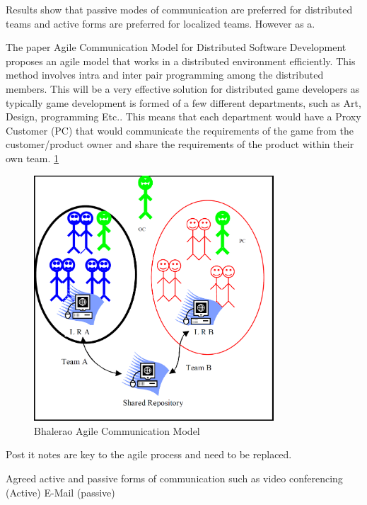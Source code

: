 \documentclass{scrartcl}
\begin{document}
Results show that passive modes of communication are preferred for distributed teams and active forms are preferred for localized teams. \cite{joshi2013} However as a. \par
The paper Agile Communication Model for Distributed Software Development \cite{bhalerao2010} proposes an agile model that works in a distributed environment efficiently. This method involves intra and inter pair programming among the distributed members. This will be a very effective solution for distributed game developers as typically game development is formed of a few different departments, such as Art, Design, programming Etc.. This means that each department would have a Proxy Customer (PC) that would communicate the requirements of the game from the customer/product owner and share the requirements of the product within their own team. \ref{fig:Agile Communication Model}


\begin{figure}[p]
    \centering
    \includegraphics[width=0.8\textwidth]{ACMDSD}
    \caption{Bhalerao Agile Communication Model}
    \label{fig:Agile Communication Model}
\end{figure}





Post it notes are key to the agile process and need to be replaced. \cite{Agile-on-the-beach-cite}

Agreed active and passive forms of communication such as video conferencing (Active) E-Mail (passive) \cite{joshi2013}
\end{document}
